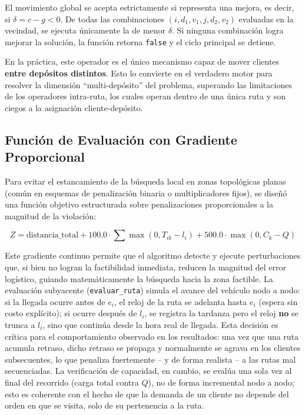 \documentclass[letter, 10pt]{article}
\begin{document}
El movimiento global se acepta estrictamente si representa una mejora, es decir, si $\delta = c - g < 0$. De todas las combinaciones $(i, d_1, v_1, j, d_2, v_2)$ evaluadas en la vecindad, se ejecuta \'unicamente la de menor $\delta$. Si ninguna combinaci\'on logra mejorar la soluci\'on, la funci\'on retorna \texttt{false} y el ciclo principal se detiene.

En la pr\'actica, este operador es el \'unico mecanismo capaz de mover clientes \textbf{entre dep\'ositos distintos}. Esto lo convierte en el verdadero motor para resolver la dimensi\'on ``multi-dep\'osito'' del problema, superando las limitaciones de los operadores intra-ruta, los cuales operan dentro de una \'unica ruta y son ciegos a la asignaci\'on cliente-dep\'osito.

\subsection{Funci\'on de Evaluaci\'on con Gradiente Proporcional}

Para evitar el estancamiento de la b\'usqueda local en zonas topol\'ogicas planas (com\'un en esquemas de penalizaci\'on binaria o multiplicadores fijos), se dise\~n\'o una funci\'on objetivo estructurada sobre penalizaciones proporcionales a la magnitud de la violaci\'on:

\begin{equation}
Z = \text{distancia\_total} + 100.0 \cdot \sum \max(0, T_{ik} - l_i) + 500.0 \cdot \max(0, C_k - Q)
\end{equation}

Este gradiente continuo permite que el algoritmo detecte y ejecute perturbaciones que, si bien no logran la factibilidad inmediata, reducen la magnitud del error log\'istico, guiando matem\'aticamente la b\'usqueda hacia la zona factible. La evaluaci\'on subyacente (\texttt{evaluar\_ruta}) simula el avance del veh\'iculo nodo a nodo: si la llegada ocurre antes de $e_i$, el reloj de la ruta se adelanta hasta $e_i$ (espera sin costo expl\'icito); si ocurre despu\'es de $l_i$, se registra la tardanza pero el reloj \textbf{no} se trunca a $l_i$, sino que contin\'ua desde la hora real de llegada. Esta decisi\'on es cr\'itica para el comportamiento observado en los resultados: una vez que una ruta acumula retraso, dicho retraso se propaga y normalmente se agrava en los clientes subsecuentes, lo que penaliza fuertemente -- y de forma realista -- a las rutas mal secuenciadas. La verificaci\'on de capacidad, en cambio, se eval\'ua una sola vez al final del recorrido (carga total contra $Q$), no de forma incremental nodo a nodo; esto es coherente con el hecho de que la demanda de un cliente no depende del orden en que se visita, solo de su pertenencia a la ruta.
\end{document}
